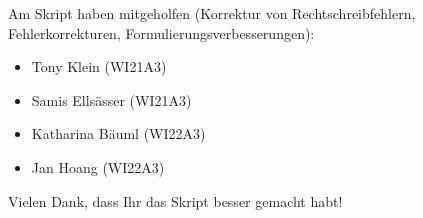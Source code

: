 Am Skript haben mitgeholfen
(Korrektur von Rechtschreibfehlern, Fehlerkorrekturen, Formulierungsverbesserungen):
\begin{itemize}
\item Tony Klein (WI21A3)
\item Samis Ellsässer (WI21A3)
\item Katharina Bäuml (WI22A3)
\item Jan Hoang (WI22A3)
\end{itemize}
Vielen Dank, dass Ihr das Skript besser gemacht habt!
